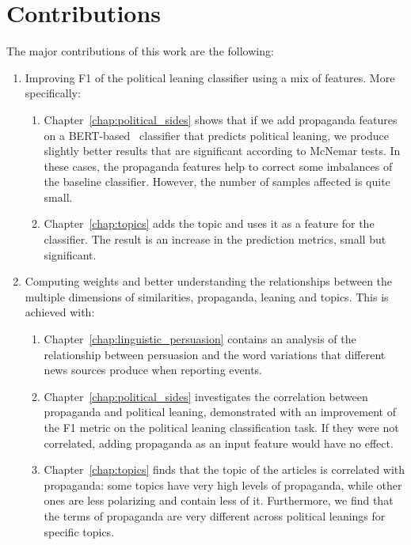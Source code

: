 \section{\statusgreen Contributions}
\label{sec:intro_contributions}

The major contributions of this work are the following:
\begin{enumerate}
    \item Improving F1 of the political leaning classifier using a mix of features. More specifically:
    \begin{enumerate}
        \item Chapter~\ref{chap:political_sides}  shows that if we add propaganda features on a BERT-based~\citep{devlin2018bert} classifier that predicts political leaning, we produce slightly better results that are significant according to McNemar tests. In these cases, the propaganda features help to correct some imbalances of the baseline classifier. However, the number of samples affected is quite small.
        \item Chapter~\ref{chap:topics} adds the topic and uses it as a feature for the classifier. The result is an increase in the prediction metrics, small but significant.
    \end{enumerate}
    \item Computing weights and better understanding the relationships between the multiple dimensions of similarities, propaganda, leaning and topics. This is achieved with:
    \begin{enumerate}
        \item Chapter~\ref{chap:linguistic_persuasion} contains an analysis of the relationship between persuasion and the word variations that different news sources produce when reporting events.
        \item Chapter~\ref{chap:political_sides} investigates the correlation between propaganda and political leaning, demonstrated with an improvement of the F1 metric on the political leaning classification task. If they were not correlated, adding propaganda as an input feature would have no effect.
        \item Chapter~\ref{chap:topics} finds that the topic of the articles is correlated with propaganda: some topics have very high levels of propaganda, while other ones are less polarizing and contain less of it. Furthermore, we find that the terms of propaganda are very different across political leanings for specific topics. %

\end{enumerate}
\end{enumerate}

